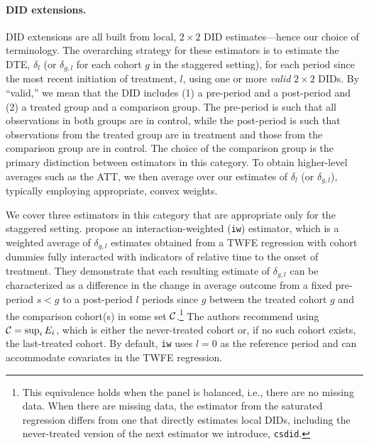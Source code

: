 \documentclass[12pt]{article}
\begin{document}
\paragraph*{DID extensions.} DID extensions are all built from local, $2 \times
2$ DID estimates---hence our choice of terminology. The overarching strategy for these estimators is to estimate the DTE, $\delta_{l}$ (or $\delta_{g,l}$ for each cohort $g$ in the staggered setting), for each period since the most recent initiation of treatment, $l$, using one or more \emph{valid} $2 \times 2$ DIDs. By ``valid,'' we mean that the DID includes (1) a pre-period and a post-period and (2) a treated group and a comparison group. The pre-period is such that all observations in both groups are in control, while the post-period is such that observations from the treated group are in treatment and those from the comparison group are in control. The choice of the comparison group is the primary distinction between estimators in this category. To obtain higher-level averages such as the ATT, we then average over our estimates of $\delta_{l}$ (or $\delta_{g,l}$), typically employing appropriate, convex weights.

We cover three estimators in this category that are appropriate only for the
staggered setting.  \citet{sun2021-event} propose an interaction-weighted
(\texttt{iw}) estimator, which is a weighted average of $\delta_{g,l}$ estimates obtained from a TWFE regression with cohort dummies fully interacted with indicators of relative time to the onset of treatment. They demonstrate that each resulting estimate of $\delta_{g,l}$ can be characterized as a difference in the change in average outcome from a fixed pre-period $s < g$ to a post-period $l$ periods since $g$ between the treated cohort $g$ and the comparison cohort(s) in some set $\mathcal{C}$.\footnote{This equivalence holds when the panel is balanced, i.e., there are no missing data. When there are missing data, the estimator from the saturated regression differs from one that directly estimates local DIDs, including the never-treated version of the next estimator we introduce, \texttt{csdid}.} The authors recommend using $\mathcal{C}={\sup_i E_i }$, which is either the never-treated cohort or, if no such cohort exists, the last-treated cohort. By default, \texttt{iw} uses $l=0$ as the reference period and can accommodate covariates in the TWFE regression. 
\end{document}

